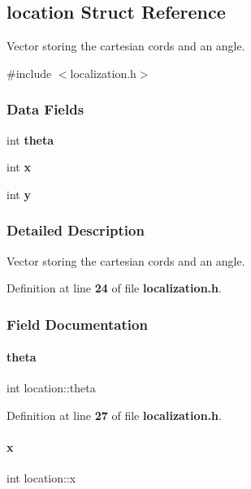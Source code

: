 \subsection{location Struct Reference}
\label{structlocation}


Vector storing the cartesian cords and an angle.  




{\ttfamily \#include $<$localization.\+h$>$}

\subsubsection*{Data Fields}
\begin{DoxyCompactItemize}
\item 
int \textbf{ theta}
\item 
int \textbf{ x}
\item 
int \textbf{ y}
\end{DoxyCompactItemize}


\subsubsection{Detailed Description}
Vector storing the cartesian cords and an angle. 

Definition at line \textbf{ 24} of file \textbf{ localization.\+h}.



\subsubsection{Field Documentation}
\mbox{\label{structlocation_a4b415222b4dcf34e49dacd22384be9eb}} 
\paragraph{theta}
{\footnotesize\ttfamily int location\+::theta}



Definition at line \textbf{ 27} of file \textbf{ localization.\+h}.

\mbox{\label{structlocation_aacd18b2506c49d221cfc37b2119e3c3c}} 
\paragraph{x}
{\footnotesize\ttfamily int location\+::x}



